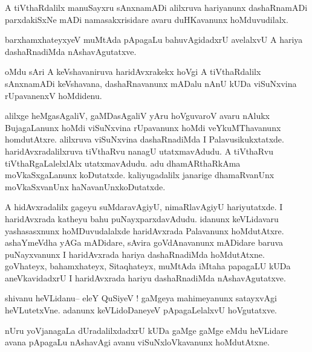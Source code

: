 \documentclass{article}
\begin{document}
\begin{mn}%
A tiVthaRdalilx manuSayxru sAnxnamADi alilxruva hariyanunx dashaRnamADi parxdakiSxNe mADi 
namasakxrisidare avaru duHKavanunx hoMduvudilalx.
\end{mn}

\begin{mn}%
barxhamxhateyxyeV muMtAda pApagaLu bahuvAgidadxrU avelalxvU A hariya dashaRnadiMda 
nAshavAgutatxve.
\end{mn}

\begin{mn}%
oMdu sAri A keVshavaniruva haridAvxrakekx hoVgi A tiVthaRdalilx sAnxnamADi keVshavana, 
dashaRnavanunx mADalu nAnU kUDa viSuNxvina rUpavanenxV hoMdidenu.
\end{mn}

\begin{mn}%
alilxge heMgasAgaliV, gaMDasAgaliV yAru hoVguvaroV avaru nAlukx BujagaLanunx hoMdi 
viSuNxvina rUpavanunx hoMdi veYkuMThavanunx homdutAtxre. alilxruva viSuNxvina dashaRnadiMda 
I Palavusikukxtatxde. haridAvxradalilxruva tiVthaRvu nanagU utatxmavAdudu. A tiVthaRvu 
tiVthaRgaLalelxlAlx utatxmavAdudu. adu dhamARthaRkAma moVkaSxgaLanunx koDutatxde. 
kaliyugadalilx janarige dhamaRvanUnx moVkaSxvanUnx haNavanUnxkoDutatxde.
\end{mn}

\begin{mn}%
A hidAvxradalilx gageyu suMdaravAgiyU, nimaRlavAgiyU hariyutatxde. I haridAvxrada katheyu 
bahu puNayxparxdavAdudu. idanunx keVLidavaru yashasasxnunx hoMDuvudalalxde haridAvxrada 
Palavanunx hoMdutAtxre. ashaYmeVdha yAGa mADidare, sAvira goVdAnavanunx mADidare baruva 
puNayxvanunx I haridAvxrada hariya dashaRnadiMda hoMdutAtxne. goVhateyx, bahamxhateyx, 
Sitaqhateyx, muMtAda iMtaha papagaLU kUDa aneVkavidadxrU I haridAvxrada hariyu 
dashaRnadiMda nAshavAgutatxve.
\end{mn}


\begin{mn}%
shivanu heVLidanu-- eleY QuSiyeV ! gaMgeya mahimeyanunx satayxvAgi heVLutetxVne. adanunx 
keVLidoDaneyeV pApagaLelalxvU hoVgutatxve.
\end{mn}

\begin{mn}%
nUru yoVjanagaLa dUradalilxdadxrU kUDa gaMge gaMge eMdu heVLidare avana pApagaLu nAshavAgi 
avanu viSuNxloVkavanunx hoMdutAtxne.
\end{mn}
\end{document}
